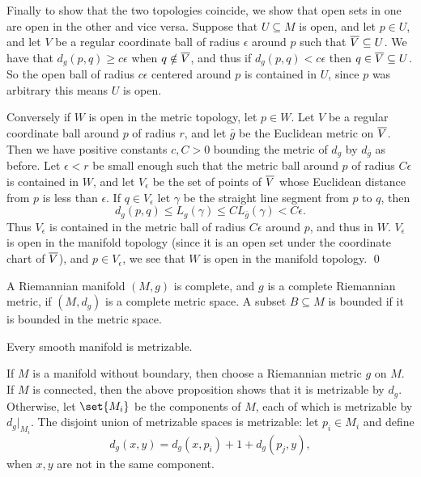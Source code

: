     Finally to show that the two topologies coincide, we show that open sets in one are open in the other and vice versa.
    Suppose that $U\subseteq M$ is open, and let $p\in U$, and let $V$ be a regular coordinate ball of radius $\epsilon$ around $p$ such that $\overline V\subseteq U$.
    We have that $d_g(p,q)\geq c\epsilon$ when $q\notin\overline V$, and thus if $d_g(p,q)<c\epsilon$ then $q\in\overline V\subseteq U$.
    So the open ball of radius $c\epsilon$ centered around $p$ is contained in $U$, since $p$ was arbitrary this means $U$ is open.

    Conversely if $W$ is open in the metric topology, let $p\in W$.
    Let $V$ be a regular coordinate ball around $p$ of radius $r$, and let $\bar g$ be the Euclidean metric on $\overline V$.
    Then we have positive constants $c,C>0$ bounding the metric of $d_g$ by $d_{\bar g}$ as before.
    Let $\epsilon<r$ be small enough such that the metric ball around $p$ of radius $C\epsilon$ is contained in $W$, and let $V_\epsilon$ be the set of points of $\overline V$
    whose Euclidean distance from $p$ is less than $\epsilon$.
    If $q\in V_\epsilon$ let $\gamma$ be the straight line segment from $p$ to $q$, then
    $$ d_g(p,q) \leq L_g(\gamma) \leq CL_{\bar g}(\gamma) < C\epsilon . $$
    Thus $V_\epsilon$ is contained in the metric ball of radius $C\epsilon$ around $p$, and thus in $W$.
    $V_\epsilon$ is open in the manifold topology (since it is an open set under the coordinate chart of $\overline V$), and $p\in V_\epsilon$, we see that $W$ is open in the
    manifold topology.
    \qed

\eproof

\bdefn

    A Riemannian manifold $(M,g)$ is {\emphcolor complete}, and $g$ is a {\emphcolor complete Riemannian metric}, if $(M,d_g)$ is a complete metric space.
    A subset $B\subseteq M$ is {\emphcolor bounded} if it is bounded in the metric space.

\edefn

\bcoro

    Every smooth manifold is metrizable.

\ecoro

\bproof

    If $M$ is a manifold without boundary, then choose a Riemannian metric $g$ on $M$.
    If $M$ is connected, then the above proposition shows that it is metrizable by $d_g$.
    Otherwise, let $\set{M_i}$ be the components of $M$, each of which is metrizable by $d_g|_{M_i}$.
    The disjoint union of metrizable spaces is metrizable: let $p_i\in M_i$ and define
    $$ d_g(x,y) = d_g(x,p_i) + 1 + d_g(p_j,y), $$
    when $x,y$ are not in the same component.

